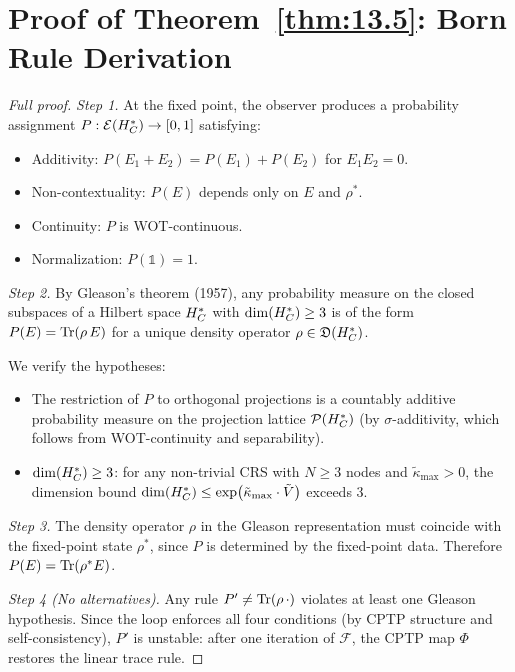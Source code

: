 \section{Proof of Theorem~\ref{thm:13.5}: Born Rule Derivation}
\label{app:pf-born}

\begin{proof}[Full proof]
\emph{Step 1.}  At the fixed point, the observer produces a probability
assignment $P : \mathcal{E}(H_C^*) \to [0,1]$ satisfying:
\begin{itemize}
  \item Additivity: $P(E_1 + E_2) = P(E_1) + P(E_2)$ for
    $E_1 E_2 = 0$.
  \item Non-contextuality: $P(E)$ depends only on $E$ and $\rho^*$.
  \item Continuity: $P$ is WOT-continuous.
  \item Normalization: $P(\mathbb{1}) = 1$.
\end{itemize}

\emph{Step 2.}  By Gleason's theorem (1957), any probability measure
on the closed subspaces of a Hilbert space $H_C^*$ with
$\dim(H_C^*) \geq 3$ is of the form $P(E) = \mathrm{Tr}(\rho\,E)$ for a
unique density operator $\rho \in \mathfrak{D}(H_C^*)$.

We verify the hypotheses:
\begin{itemize}
  \item The restriction of $P$ to orthogonal projections is a
    countably additive probability measure on the projection lattice
    $\mathcal{P}(H_C^*)$ (by $\sigma$-additivity, which follows from
    WOT-continuity and separability).
  \item $\dim(H_C^*) \geq 3$: for any non-trivial CRS with $N \geq 3$
    nodes and $\tilde{\kappa}_{\max} > 0$, the dimension bound
    $\dim(H_C^*) \leq \exp(\tilde{\kappa}_{\max} \cdot \tilde{V})$
    exceeds $3$.
\end{itemize}

\emph{Step 3.}  The density operator $\rho$ in the Gleason representation
must coincide with the fixed-point state $\rho^*$, since $P$ is
determined by the fixed-point data.  Therefore $P(E) = \mathrm{Tr}(\rho^* E)$.

\emph{Step 4 (No alternatives).}  Any rule $P' \neq \mathrm{Tr}(\rho\,\cdot)$
violates at least one Gleason hypothesis.  Since the loop enforces
all four conditions (by CPTP structure and self-consistency), $P'$ is
unstable: after one iteration of $\mathcal{F}$, the CPTP map $\Phi$
restores the linear trace rule.
\end{proof}


